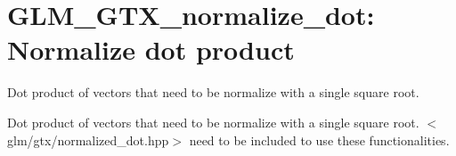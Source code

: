 \hypertarget{group__gtx__normalize__dot}{\section{\-G\-L\-M\-\_\-\-G\-T\-X\-\_\-normalize\-\_\-dot\-: \-Normalize dot product}
\label{group__gtx__normalize__dot}
}


\-Dot product of vectors that need to be normalize with a single square root.  


\-Dot product of vectors that need to be normalize with a single square root. $<$glm/gtx/normalized\-\_\-dot.\-hpp$>$ need to be included to use these functionalities. 